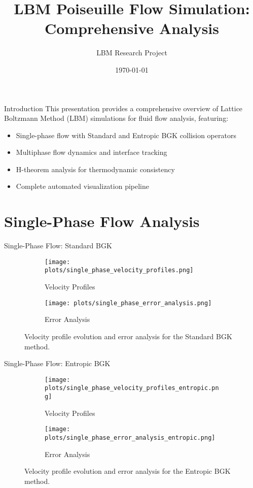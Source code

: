 \documentclass{beamer}
\title{LBM Poiseuille Flow Simulation: Comprehensive Analysis}
\author{LBM Research Project}
\date{\today}
\begin{document}
\begin{frame}
  \titlepage
\end{frame}

\begin{frame}{Introduction}
  This presentation provides a comprehensive overview of Lattice Boltzmann Method (LBM) simulations for fluid flow analysis, featuring:
  \begin{itemize}
    \item Single-phase flow with Standard and Entropic BGK collision operators
    \item Multiphase flow dynamics and interface tracking
    \item H-theorem analysis for thermodynamic consistency
    \item Complete automated visualization pipeline
  \end{itemize}
\end{frame}

\section{Single-Phase Flow Analysis}

\begin{frame}{Single-Phase Flow: Standard BGK}
  \begin{figure}
    \begin{subfigure}[b]{0.48\textwidth}
      \texttt{[image: plots/single\_phase\_velocity\_profiles.png]}
      \caption{Velocity Profiles}
    \end{subfigure}
    \hfill
    \begin{subfigure}[b]{0.48\textwidth}
      \texttt{[image: plots/single\_phase\_error\_analysis.png]}
      \caption{Error Analysis}
    \end{subfigure}
    \caption{Velocity profile evolution and error analysis for the Standard BGK method.}
  \end{figure}
\end{frame}

\begin{frame}{Single-Phase Flow: Entropic BGK}
  \begin{figure}
    \begin{subfigure}[b]{0.48\textwidth}
      \texttt{[image: plots/single\_phase\_velocity\_profiles\_entropic.png]}
      \caption{Velocity Profiles}
    \end{subfigure}
    \hfill
    \begin{subfigure}[b]{0.48\textwidth}
      \texttt{[image: plots/single\_phase\_error\_analysis\_entropic.png]}
      \caption{Error Analysis}
    \end{subfigure}
    \caption{Velocity profile evolution and error analysis for the Entropic BGK method.}
  \end{figure}
\end{frame}
\end{document}
